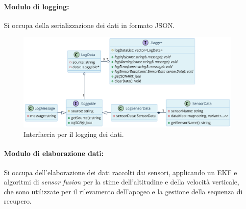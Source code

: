 \documentclass[12pt,a4paper,twoside]{book}
\begin{document}
\newpage
\paragraph{\textbf{Modulo di logging:}}Si occupa della serializzazione dei dati in formato JSON.
\begin{figure}[H]
    \centering
    \includegraphics[width=1\textwidth]{img/uml/logger.png}
    \caption{Interfaccia per il logging dei dati.}
    \label{fig:flight-computer-logger}
\end{figure}

\newpage
\paragraph{\textbf{Modulo di elaborazione dati:}}Si occupa dell'elaborazione dei
dati raccolti dai sensori, applicando un \ac{EKF} e algoritmi di \emph{sensor
    fusion} per la stime dell'altitudine e della velocità verticale, che sono
utilizzate per il rilevamento dell'apogeo e la gestione della sequenza di recupero.

\newpage
\end{document}
